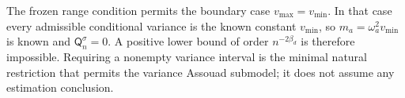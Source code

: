 The frozen range condition permits the boundary case \(v_{\max}=v_{\min}\).  In that case every admissible conditional variance is the known constant \(v_{\min}\), so \(m_a=\omega_a^2v_{\min}\) is known and \(\mathsf Q_n^{\sigma}=0\).  A positive lower bound of order \(n^{-2\beta_d}\) is therefore impossible.  Requiring a nonempty variance interval is the minimal natural restriction that permits the variance Assouad submodel; it does not assume any estimation conclusion.
